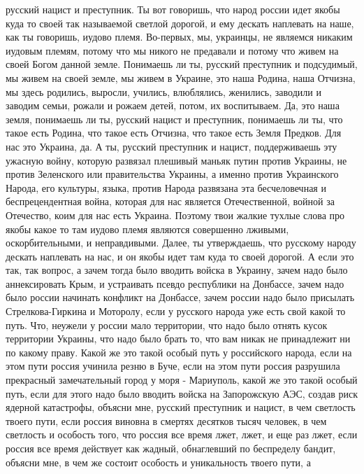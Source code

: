  
 
 
 
 


русский нацист и преступник. Ты вот говоришь, что народ россии идет якобы куда
то своей так называемой светлой дорогой, и ему дескать наплевать на наше, как
ты говоришь, иудово племя. Во-первых, мы, украинцы, не являемся никаким иудовым
племям, потому что мы никого не предавали и потому что живем на своей Богом
данной земле. Понимаешь ли ты, русский преступник и подсудимый, мы живем на
своей земле, мы живем в Украине, это наша Родина, наша Отчизна, мы здесь
родились, выросли, учились, влюблялись, женились, заводили и заводим семьи,
рожали и рожаем детей, потом, их воспитываем. Да, это наша земля, понимаешь ли
ты, русский нацист и преступник, понимаешь ли ты, что такое есть Родина, что
такое есть Отчизна, что такое есть Земля Предков. Для нас это Украина, да. А
ты, русский преступник и нацист, поддерживаешь эту ужасную войну, которую
развязал плешивый маньяк путин против Украины, не против Зеленского или
правительства Украины, а именно против Украинского Народа, его культуры, языка,
против Народа развязана эта бесчеловечная и беспрецендентная война, которая для
нас является Отечественной, войной за Отечество, коим для нас есть Украина.
Поэтому твои жалкие тухлые слова про якобы какое то там иудово племя являются
совершенно лживыми, оскорбительными, и неправдивыми. Далее, ты утверждаешь, что
русскому народу дескать наплевать на нас, и он якобы идет там куда то своей
дорогой.  А если это так, так вопрос, а зачем тогда было вводить войска в
Украину, зачем надо было аннексировать Крым, и устраивать псевдо республики на
Донбассе, зачем надо было россии начинать конфликт на Донбассе, зачем россии
надо было присылать Стрелкова-Гиркина и Моторолу, если у русского народа уже
есть свой какой то путь. Что, неужели у россии мало территории, что надо было
отнять кусок территории Украины, что надо было брать то, что вам никак не
принадлежит ни по какому праву.  Какой же это такой особый путь у российского
народа, если на этом пути россия учинила резню в Буче, если на этом пути россия
разрушила прекрасный замечательный город у моря - Мариуполь, какой же это такой
особый путь, если для этого надо было вводить войска на Запорожскую АЭС, создав
риск ядерной катастрофы, объясни мне, русский преступник и нацист, в чем
светлость твоего пути, если россия виновна в смертях десятков тысяч человек, в
чем светлость и особость того, что россия все время лжет, лжет, и еще раз лжет,
если россия все время действует как жадный, обнаглевший по беспределу бандит,
объясни мне, в чем же состоит особость и уникальность твоего пути, а


